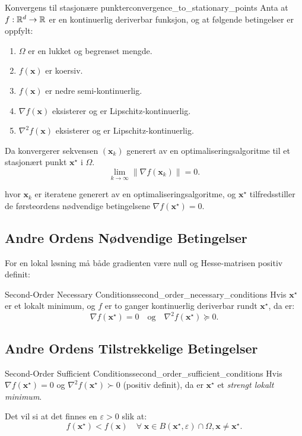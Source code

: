 \begin{theorem}{Konvergens til stasjonære punkter}{convergence_to_stationary_points}
	Anta at \(f: \mathbb{R}^d \to \mathbb{R}\) er en kontinuerlig deriverbar funksjon, og at følgende betingelser er oppfylt:
	\begin{enumerate}
		\item \(\Omega\) er en lukket og begrenset mengde.
		\item \(f(\symbf{x})\) er koersiv.
		\item \(f(\symbf{x})\) er nedre semi-kontinuerlig.
		\item \(\nabla f(\symbf{x})\) eksisterer og er Lipschitz-kontinuerlig.
		\item \(\nabla^2 f(\symbf{x})\) eksisterer og er Lipschitz-kontinuerlig.
	\end{enumerate}
	Da konvergerer sekvensen \((\symbf{x}_k)\) generert av en optimaliseringsalgoritme til et stasjonært punkt \(\symbf{x}^\star\) i \(\Omega\).
	\[
		\lim_{k \to \infty} \|\nabla f(\symbf{x}_k)\| = 0.
	\]

	hvor \(\symbf{x}_k\) er iteratene generert av en optimaliseringsalgoritme, og \(\symbf{x}^\star\) tilfredsstiller de førsteordens nødvendige betingelsene \(\nabla f(\symbf{x}^\star) = 0\).

\end{theorem}

\subsection{Andre Ordens Nødvendige Betingelser}

For en lokal løsning må både gradienten være null og Hesse-matrisen positiv definit:

\begin{theorem}{Second-Order Necessary Conditions}{second_order_necessary_conditions}
	Hvis \(\mathbf{x}^\star\) er et lokalt minimum, og \(f\) er to ganger kontinuerlig deriverbar rundt \(\mathbf{x}^\star\), da er:
	\[
		\nabla f(\mathbf{x}^\star) = 0 \quad \text{og} \quad \nabla^2 f(\mathbf{x}^\star) \succeq 0.
	\]
\end{theorem}

\subsection{Andre Ordens Tilstrekkelige Betingelser}

\begin{theorem}{Second-Order Sufficient Conditions}{second_order_sufficient_conditions}
	Hvis \(\nabla f(\mathbf{x}^\star) = 0\) og \(\nabla^2 f(\mathbf{x}^\star) \succ 0\) (positiv definit), da er \(\mathbf{x}^\star\) et \emph{strengt lokalt minimum}.

	\medskip

	Det vil si at det finnes en \(\varepsilon > 0\) slik at:
	\[
		f(\mathbf{x}^\star) < f(\mathbf{x})  \quad \forall \; \mathbf{x} \in B(\mathbf{x}^\star, \varepsilon) \cap \Omega, \mathbf{x} \neq \mathbf{x}^\star.
	\]
\end{theorem}

